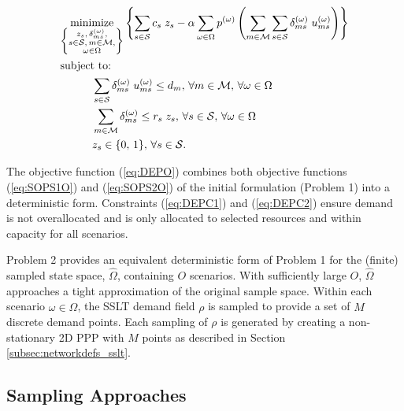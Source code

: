 \documentclass[12pt,dvipsnames]{report}
\begin{document}
\begin{tcolorbox}[floatplacement = !ht, float, title = Problem 2 -- Deterministic Equivalent Program (DEP)]
\begin{align}
& \underset{\left\{ \substack{
	z_s,\, \delta_{ms}^{(\omega)},\\
	s \in \mathcal{S},\, m \in \mathcal{M},\\
	\omega \in \Omega} \right\}} {\text{minimize}}
\left\{ \sum_{s \in \mathcal{S}} c_s \; z_s - \alpha \sum_{\omega \in \Omega} p^{(\omega)} \left( \sum_{m \in \mathcal{M}} \sum_{s \in \mathcal{S}} \delta_{ms}^{(\omega)} \; u_{ms}^{(\omega)} \right) \right\} \label{eq:DEPO}\\
& \text{subject to:}  \nonumber \\
& \hspace{0.4in} \sum_{s \in \mathcal{S}} \delta_{ms}^{(\omega)} \; u_{ms}^{(\omega)} \leq d_m,\, \forall m \in \mathcal{M},\, \forall \omega \in \Omega \label{eq:DEPC1}\\
& \hspace{0.4in} \sum_{m \in \mathcal{M}} \delta_{ms}^{(\omega)} \leq r_s \; z_s,\, \forall s \in \mathcal{S},\, \forall \omega \in \Omega \label{eq:DEPC2}\\
& \hspace{0.4in} z_s \in \{0,\, 1\},\, \forall s \in \mathcal{S}. \label{eq:DEPC3}
\end{align}
\end{tcolorbox}

%
The objective function (\cref{eq:DEPO}) combines both objective functions (\cref{eq:SOPS1O}) and (\cref{eq:SOPS2O}) of the initial formulation (Problem 1) into a deterministic form.  Constraints (\cref{eq:DEPC1}) and (\cref{eq:DEPC2})	ensure demand is not overallocated and is only allocated to selected resources and within capacity for all scenarios.

Problem 2 provides an equivalent deterministic form of Problem 1 for the (finite) sampled state space, $\hat{\Omega}$, containing $O$ scenarios.  With sufficiently large $O$, $\hat{\Omega}$ approaches a tight approximation of the original sample space.  Within each scenario $\omega \in \hat{\Omega}$, the SSLT demand field $\rho$ is sampled to provide a set of $M$ discrete demand points.  Each sampling of $\rho$ is generated by creating a non-stationary 2D PPP with $M$ points as described in Section \ref{subsec:networkdefs_sslt}.

\subsection{Sampling Approaches} \label{subsec:dep_sampling}
\end{document}
